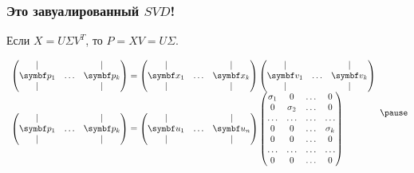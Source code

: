 \begin{frame}
  \frametitle{Это завуалированный $SVD$!}

  Если $X = U\Sigma V^T$, то $P = XV = U\Sigma$. \pause

  \[
    \begin{array}{l}
    \begin{pmatrix}
        \vert &  & \vert \\
        \bp_1 & \ldots & \bp_k \\
        \vert &    & \vert \\
      \end{pmatrix}  = 
      \begin{pmatrix}
        \vert &  & \vert \\
        \bx_1 & \ldots & \bx_k \\
        \vert &    & \vert \\
      \end{pmatrix}
      \begin{pmatrix}
        \vert &  & \vert \\
        \bv_1 & \ldots & \bv_k \\
        \vert &    & \vert \\
      \end{pmatrix} \\
      \begin{pmatrix}
        \vert &  & \vert \\
        \bp_1 & \ldots & \bp_k \\
        \vert &    & \vert \\
      \end{pmatrix}  = 
      \begin{pmatrix}
        \vert &  & \vert \\
        \bu_1 & \ldots & \bu_n \\
        \vert &    & \vert \\
      \end{pmatrix}
      \begin{pmatrix}
        \sigma_1 & 0 & \ldots & 0 \\
         0 & \sigma_2 & \ldots & 0 \\
        \ldots & \ldots & \ldots & \ldots \\
    0 & 0 & \ldots & \sigma_k \\
    0 & 0 & \ldots & 0 \\
    \ldots & \ldots & \ldots & \ldots \\
    0 & 0 & \ldots & 0 \\
      \end{pmatrix} 
    \end{array} \pause
  \]





  

\end{frame}




